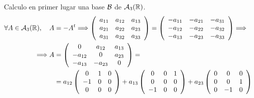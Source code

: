 \documentclass[12pt]{article}
\begin{document}
\begin{ejercicio}
\begin{enumerate}
        Calculo en primer lugar una base $\mathcal{B}$ de $\mathcal{A}_3(\mathbb{R})$.
        \begin{equation*}\begin{split}
            \forall A\in \mathcal{A}_3(\mathbb{R}),\quad A&=-A^t \Longrightarrow
            \left(\begin{array}{ccc}
                a_{11} & a_{12} & a_{13} \\
                a_{21} & a_{22} & a_{23} \\
                a_{31} & a_{32} & a_{33} \\
            \end{array}\right)
            = \left(\begin{array}{ccc}
                -a_{11} & -a_{21} & -a_{31} \\
                -a_{12} & -a_{22} & -a_{32} \\
                -a_{13} & -a_{23} & -a_{33} \\
            \end{array}\right)
            \Longrightarrow \\ \Longrightarrow
            A &= \left(\begin{array}{ccc}
                0 & a_{12} & a_{13} \\
                -a_{12} & 0 & a_{23} \\
                -a_{13} & -a_{23} & 0 \\
            \end{array}\right)
            =\\&= a_{12} \left(\begin{array}{ccc}
                0 & 1 & 0 \\
                -1 & 0 & 0 \\
                0 & 0 & 0 \\
            \end{array}\right)
            + a_{13}\left(\begin{array}{ccc}
                0 & 0 & 1 \\
                0 & 0 & 0 \\
                -1 & 0 & 0 \\
            \end{array}\right)
            + a_{23}\left(\begin{array}{ccc}
                0 & 0 & 0 \\
                0 & 0 & 1 \\
                0 & -1 & 0 \\
            \end{array}\right)
        \end{split}\end{equation*}


\end{enumerate}
\end{ejercicio}
\end{document}
